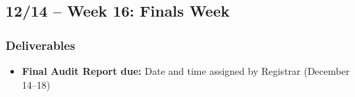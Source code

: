 \documentclass[12pt]{article}
\begin{document}
\subsection*{12/14 -- Week 16: Finals Week}
    \subsubsection*{Deliverables}
        \begin{itemize}
            \item \textbf{Final Audit Report due:} Date and time assigned by Registrar (December 14--18)
        \end{itemize}
\end{document}
